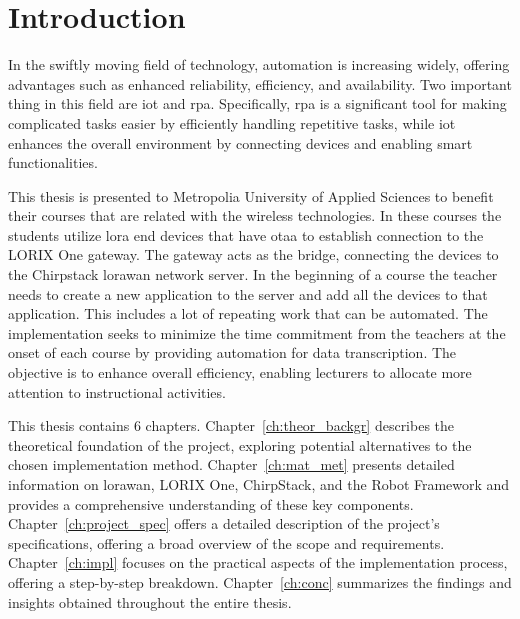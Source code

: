 
\chapter{Introduction}

In the swiftly moving field of technology, automation is increasing widely, offering advantages such as enhanced reliability, efficiency, and availability.
Two important thing in this field are  \gls{iot} and \gls{rpa}. Specifically, \gls{rpa} is a significant tool for making complicated tasks easier by efficiently handling repetitive tasks, while \gls{iot} enhances the overall environment by connecting devices and enabling smart functionalities. 

This thesis is presented to Metropolia University of Applied Sciences to benefit their courses that are related with the wireless technologies. In these courses the students utilize \gls{lora} end devices that have \gls{otaa} to establish connection to the LORIX One gateway. The gateway acts as the bridge, connecting the devices to the Chirpstack \gls{lorawan} network server. In the beginning of a course the teacher needs to create a new application to the server and add all the devices to that application. This includes a lot of repeating work that can be automated. The implementation seeks to minimize the time commitment from the teachers at the onset of each course by providing automation for data transcription. The objective is to enhance overall efficiency, enabling lecturers to allocate more attention to instructional activities.

This thesis contains 6 chapters.
Chapter~\ref{ch:theor_backgr} describes the theoretical foundation of the project, exploring potential alternatives to the chosen implementation method.
Chapter~\ref{ch:mat_met} presents detailed information on \gls{lorawan}, LORIX One, ChirpStack, and the Robot Framework and provides a comprehensive understanding of these key components.
Chapter~\ref{ch:project_spec} offers a detailed description of the project's specifications, offering a broad overview of the scope and requirements. 
Chapter~\ref{ch:impl} focuses on the practical aspects of the implementation process, offering a step-by-step breakdown.
Chapter~\ref{ch:conc} summarizes the findings and insights obtained throughout the entire thesis.


\clearpage %
